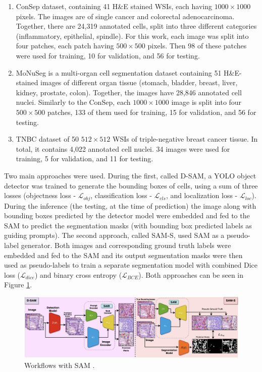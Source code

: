 \begin{enumerate}
    \item ConSep dataset, containing 41 H\&E stained WSIs, each having $1000\!\times\!1000$ pixels. The images are of single cancer and colorectal adenocarcinoma. Together, there are 24,319 annotated cells, split into three different categories (inflammatory, epithelial, spindle). For this work, each image was split into four patches, each patch having $500\!\times\!500$ pixels. Then 98 of these patches were used for training, 10 for validation, and 56 for testing.
    \item MoNuSeg is a multi-organ cell segmentation dataset containing 51 H\&E-stained images of different organ tissue (stomach, bladder, breast, liver, kidney, prostate, colon). Together, the images have 28,846 annotated cell nuclei. Similarly to the ConSep, each $1000\!\times\!1000$ image is split into four $500\!\times\!500$ patches, 133 of them used for training, 15 for validation, and 56 for testing.
    \item TNBC dataset of 50 $512\!\times\!512$ WSIs of triple-negative breast cancer tissue. In total, it contains 4,022 annotated cell nuclei. 34 images were used for training, 5 for validation, and 11 for testing.
\end{enumerate}

Two main approaches were used. During the first, called D-SAM, a YOLO object detector was trained to generate the bounding boxes of cells, using a sum of three losses (objectness loss - $\mathcal{L}_{obj}$, classification loss - $\mathcal{L}_{cls}$, and localization loss - $\mathcal{L}_{loc}$). During the inference (the testing, at the time of prediction) the image along with bounding boxes predicted by the detector model were embedded and fed to the SAM to predict the segmentation masks (with bounding box predicted labels as guiding prompts). The second approach, called SAM-S, used SAM as a pseudo-label generator. Both images and corresponding ground truth labels were embedded and fed to the SAM and its output segmentation masks were then used as pseudo-labels to train a separate segmentation model with combined Dice loss ($\mathcal{L}_{dice}$) and binary cross entropy ($\mathcal{L}_{BCE}$). Both approaches can be seen in Figure \ref{fig:rw-sam}. 

\begin{figure}[H]
    \begin{centering}
    \includegraphics[width=14cm]{assets/images/rw-sam.png}
    \par\end{centering}
    \caption{Workflows with SAM \cite{Shamshad2023}.}
    \label{fig:rw-sam}
\end{figure}

